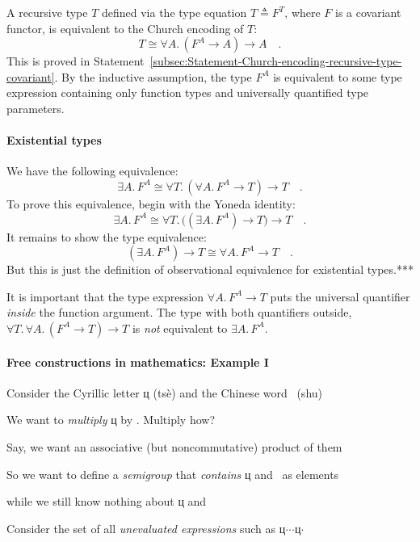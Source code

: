 A recursive type $T$ defined via the type equation $T\triangleq F^{T}$,
where $F$ is a covariant functor, is equivalent to the Church encoding
of $T$:
\[
T\cong\forall A.\,(F^{A}\rightarrow A)\rightarrow A\quad.
\]
This is proved in Statement~\ref{subsec:Statement-Church-encoding-recursive-type-covariant}.
By the inductive assumption, the type $F^{A}$ is equivalent to some
type expression containing only function types and universally quantified
type parameters.

\paragraph{Existential types}

We have the following equivalence:
\[
\exists A.\,F^{A}\cong\forall T.\,(\forall A.\,F^{A}\rightarrow T)\rightarrow T\quad.
\]
To prove this equivalence, begin with the Yoneda identity:
\[
\exists A.\,F^{A}\cong\forall T.\,\big((\exists A.\,F^{A})\rightarrow T\big)\rightarrow T\quad.
\]
It remains to show the type equivalence: 
\[
(\exists A.\,F^{A})\rightarrow T\cong\forall A.\,F^{A}\rightarrow T\quad.
\]
But this is just the definition of observational equivalence for existential
types.{*}{*}{*}

It is important that the type expression $\forall A.\,F^{A}\rightarrow T$
puts the universal quantifier \emph{inside} the function argument.
The type with both quantifiers outside, $\forall T.\,\forall A.\,(F^{A}\rightarrow T)\rightarrow T$
is \emph{not} equivalent to $\exists A.\,F^{A}$.

\paragraph{Free constructions in mathematics: Example I}

Consider the Cyrillic letter \foreignlanguage{russian}{ц} (ts\`{e})
and the Chinese word \shui~(shu)

We want to \emph{multiply} \foreignlanguage{russian}{ц} by \shui.
Multiply how?

Say, we want an associative (but noncommutative) product of them

So we want to define a \emph{semigroup} that \emph{contains} \foreignlanguage{russian}{ц}
and \shui~as elements

while we still know nothing about \foreignlanguage{russian}{ц} and
\shui

Consider the set of all \emph{unevaluated expressions} such as \foreignlanguage{russian}{ц}$\cdot$\shui$\cdot$\shui$\cdot$\foreignlanguage{russian}{ц}$\cdot$\shui

